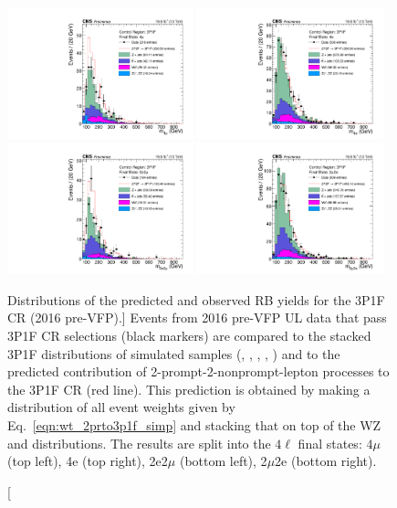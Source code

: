 \begin{figure}[!htbp]
	\begin{center}
		\includegraphics[width=0.48\textwidth]{figures/higgsmassmeas/redbkg/cr/UL2016preVFP_CR_3P1F_4mu.pdf}
		\includegraphics[width=0.48\textwidth]{figures/higgsmassmeas/redbkg/cr/UL2016preVFP_CR_3P1F_4e.pdf}
		\includegraphics[width=0.48\textwidth]{figures/higgsmassmeas/redbkg/cr/UL2016preVFP_CR_3P1F_2e2mu.pdf}
		\includegraphics[width=0.48\textwidth]{figures/higgsmassmeas/redbkg/cr/UL2016preVFP_CR_3P1F_2mu2e.pdf}
		\caption
			[Distributions of the predicted and observed RB yields for the 3P1F CR (2016 pre-VFP).]
			{
			Events from 2016 pre-VFP UL data that pass 3P1F CR selections (black markers) 
			are compared to the stacked 3P1F distributions of simulated samples
			(\Zplusjets, \ttbarplusjets, \WZ, \ZZ, \Zgammastar)
			and to the predicted contribution of 2-prompt-2-nonprompt-lepton processes to the 3P1F CR (red line).
			This prediction is obtained by making a distribution of all event weights given by Eq.~\ref{eqn:wt_2prto3p1f_simp} and stacking that on top of the WZ and \ZZ distributions.
			The results are split into the $4\ell$ final states:
			$4\mu$ (top left), 4e (top right), 2e2$\mu$ (bottom left), 2$\mu$2e (bottom right).
			}
		\label{cr_plots_3p1f_2016prevfp}
	\end{center}
\end{figure}
